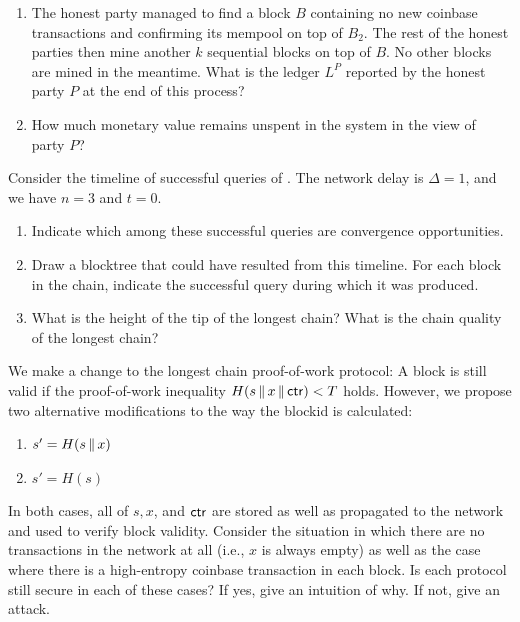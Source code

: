 \begin{problems}
\begin{enumerate}
                are mined. Which transactions will the mempool of this party
                contain?
          \item The honest party managed to find a block $B$ containing no new
                coinbase transactions and confirming its mempool on top of
                $B_2$. The rest of the honest parties then mine another $k$
                sequential blocks on top of $B$. No other blocks are mined in
                the meantime. What is the ledger $L^P$ reported by the honest
                party $P$ at the end of this process?
          \item How much monetary value remains unspent in the system in the
                view of party $P$?
        \end{enumerate}
  \item Consider the timeline of successful queries of . The
        network delay is $\Delta = 1$, and we have $n = 3$ and $t = 0$.
        \label{problem.timeline}
        \begin{enumerate}
          \item Indicate which among these successful queries are convergence
                opportunities.
          \item Draw a blocktree that could have resulted from this timeline.
                For each block in the chain, indicate the successful query
                during which it was produced.
          \item What is the height of the tip of the longest chain? What is the
                chain quality of the longest chain?
        \end{enumerate}
  \item We make a change to the longest chain proof-of-work protocol:
        A block is still valid if the proof-of-work inequality $H(s \,\|\, x \,\|\, \mathsf{ctr}) < T$
        holds. However, we propose two alternative modifications to the way the blockid is calculated:

        \begin{enumerate}
          \item $s' = H(s \,\|\, x)$
          \item $s' = H(s)$
        \end{enumerate}

        In both cases, all of $s, x$, and $\mathsf{ctr}$ are stored as well as propagated to the network
        and used to verify block validity.
        Consider the situation in which there are no transactions in the network at all (i.e.,
        $x$ is always empty) as well as the case where there is a high-entropy coinbase transaction
        in each block.
        Is each protocol still secure in each of these cases?
        If yes, give an intuition of why. If not, give an attack.


\end{problems}
